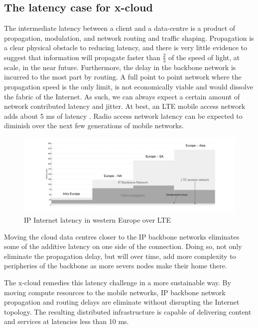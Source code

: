 \documentclass[conference]{IEEEtran}
\newcommand{\xcloud}{x-cloud }
\begin{document}
\subsection{The latency case for \xcloud}
The intermediate latency between a client and a data-centre is a product of propagation, modulation, and network routing and traffic shaping. Propagation is a clear physical obstacle to reducing latency, and there is very little evidence to suggest that information will propagate faster than $\frac{2}{3}$ of the speed of light, at scale, in the near future. Furthermore, the delay in the backbone network is incurred to the most part by routing. A full point to point network where the propagation speed is the only limit, is not economically viable and would dissolve the fabric of the Internet. As such, we can always expect a certain amount of network contributed latency and jitter. At best, an LTE mobile access network adds about 5 ms of latency \cite{blajic2006latency}. Radio access network latency can be expected to diminish over the next few generations of mobile networks. 

\begin{figure}[tb]
	\centering
	\includegraphics[height=0.12\paperheight]{omni_motivation.pdf} 
	\caption{IP Internet latency in western Europe \cite{BT_IP} over LTE \cite{blajic2006latency}}
	\label{fig:omni_motivation}
\end{figure}

Moving the cloud data centres closer to the IP backbone networks eliminates some of the additive latency on one side of the connection. Doing so, not only eliminate the propagation delay, but will over time, add more complexity to peripheries of the backbone as more severs nodes make their home there. 

The \xcloud remedies this latency challenge in a more sustainable way. By moving compute resources to the mobile networks, IP backbone network propagation and routing delays are eliminate without disrupting the Internet topology. The resulting distributed infrastructure is capable of delivering content and services at latencies less than 10 ms. 
\end{document}
